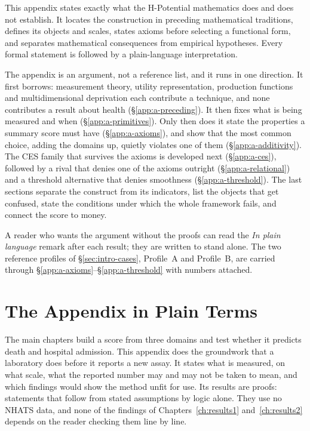 \label{app:mathematical_foundations}

This appendix states exactly what the H-Potential mathematics does and does not
establish. It locates the construction in preceding mathematical traditions,
defines its objects and scales, states axioms before selecting a functional
form, and separates mathematical consequences from empirical hypotheses. Every
formal statement is followed by a plain-language interpretation.

\begin{ataglance}
The appendix is an argument, not a reference list, and it runs in one
direction. It first borrows: measurement theory, utility representation,
production functions and multidimensional deprivation each contribute a
technique, and none contributes a result about health
(\S\ref{app:a-preceding}). It then fixes what is being measured and when
(\S\ref{app:a-primitives}). Only then does it state the properties a summary
score must have (\S\ref{app:a-axioms}), and show that the most common choice,
adding the domains up, quietly violates one of them
(\S\ref{app:a-additivity}). The CES family that survives the axioms is
developed next (\S\ref{app:a-ces}), followed by a rival that denies one of the
axioms outright (\S\ref{app:a-relational}) and a threshold alternative that
denies smoothness (\S\ref{app:a-threshold}). The last sections separate the
construct from its indicators, list the objects that get confused, state the
conditions under which the whole framework fails, and connect the score to
money.

A reader who wants the argument without the proofs can read the
\emph{In plain language} remark after each result; they are written to stand
alone. The two reference profiles of
\S\ref{sec:intro-cases}, Profile~A and Profile~B, are carried through
\S\ref{app:a-axioms}--\S\ref{app:a-threshold} with numbers attached.
\end{ataglance}

\section*{The Appendix in Plain Terms}

The main chapters build a score from three domains and test whether it
predicts death and hospital admission. This appendix does the groundwork that
a laboratory does before it reports a new assay. It states what is measured, on
what scale, what the reported number may and may not be taken to mean, and
which findings would show the method unfit for use. Its results are proofs:
statements that follow from stated assumptions by logic alone. They use no
NHATS data, and none of the findings of Chapters~\ref{ch:results1}
and~\ref{ch:results2} depends on the reader checking them line by line.

